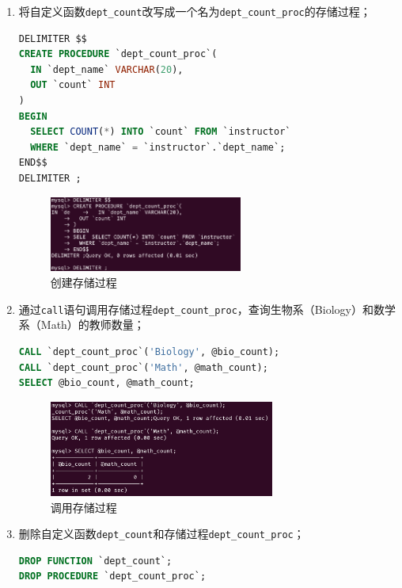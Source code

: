 \documentclass{article}
\renewcommand\tt{\texttt}
\begin{document}
\begin{enumerate}
  \item 将自定义函数\tt{dept\_count}改写成一个名为\tt{dept\_count\_proc}的存储过程；

        \begin{lstlisting}[language=sql]
DELIMITER $$
CREATE PROCEDURE `dept_count_proc`(
  IN `dept_name` VARCHAR(20),
  OUT `count` INT
)
BEGIN
  SELECT COUNT(*) INTO `count` FROM `instructor` 
  WHERE `dept_name` = `instructor`.`dept_name`;
END$$
DELIMITER ;
\end{lstlisting}

        \begin{figure}[H]
          \centering
          \includegraphics[width=0.6\textwidth]{img/6.png}
          \caption{创建存储过程}
        \end{figure}

  \item 通过\tt{call}语句调用存储过程\tt{dept\_count\_proc}，查询生物系（Biology）和数学系（Math）的教师数量；

        \begin{lstlisting}[language=sql]
CALL `dept_count_proc`('Biology', @bio_count);
CALL `dept_count_proc`('Math', @math_count);
SELECT @bio_count, @math_count;
\end{lstlisting}

        \begin{figure}[H]
          \centering
          \includegraphics[width=0.7\textwidth]{img/7.png}
          \caption{调用存储过程}
        \end{figure}

  \item 删除自定义函数\tt{dept\_count}和存储过程\tt{dept\_count\_proc}；

        \begin{lstlisting}[language=sql]
DROP FUNCTION `dept_count`;
DROP PROCEDURE `dept_count_proc`;
\end{lstlisting}


\end{enumerate}
\end{document}
